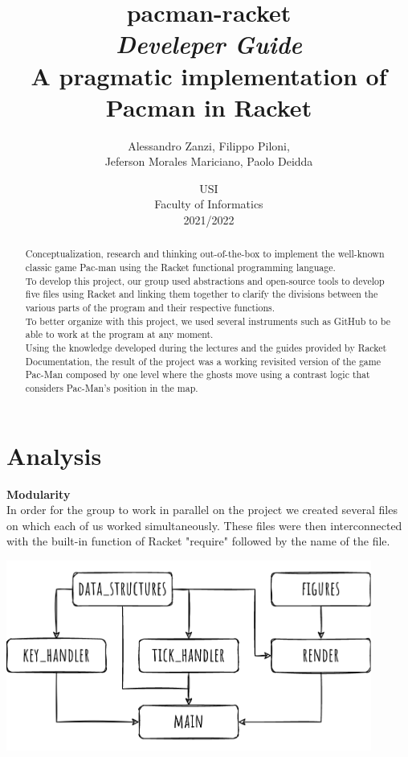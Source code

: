 \documentclass{article}
\title{
\textbf{pacman-racket} \\
\textit{Develeper Guide}\\
A pragmatic implementation of Pacman in Racket
}
\author{
    Alessandro Zanzi,
    Filippo Piloni,\\
    Jeferson Morales Mariciano,
    Paolo Deidda
}
\date{
USI \\
Faculty of Informatics \\
[\baselineskip]  2021/2022
}
\begin{document}
\begin{titlepage}
\maketitle  

\end{titlepage}
 \begin{abstract}
Conceptualization, research and thinking out-of-the-box
to implement the well-known classic game Pac-man
using the Racket functional programming language.\\
To develop this project, our group used abstractions and open-source tools to develop five files using Racket and linking them together to clarify the divisions between the various parts of the program and their respective functions.\\
To better organize with this project, we used several instruments such as GitHub to be able to work at the program at any moment.\\
Using the knowledge developed during the lectures and the guides provided by Racket Documentation, the result of the project was a working revisited version of the game Pac-Man composed by one level where the ghosts move using a contrast logic that considers Pac-Man's position in the map.

 \end{abstract}
\clearpage
 \tableofcontents
 \clearpage
 \section{Analysis}
 
 \hspace{0.5cm}\textbf{Modularity}\\
 In order for the group to work in parallel on the project we created several files on which each of us worked simultaneously. These files were then interconnected with the built-in function of Racket "require" followed by the name of the file.

   \begin{center}
 \includegraphics[width=12cm]{images/dependency_tree.png}
 \end{center}
 
\end{document}
